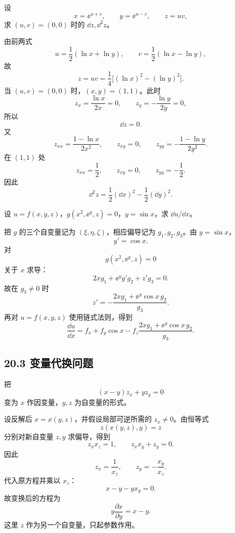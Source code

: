 \begin{xexercise}[20.2.5 练习题 7]
设
\[
  x=\ee^{u+v},\qquad y=\ee^{u-v},\qquad z=uv,
\]
求 $(u,v)=(0,0)$ 时的 $\dd z,\dd^2z$。
\end{xexercise}
\begin{xsolution}
由前两式
\[
  u=\frac12(\ln x+\ln y),
  \qquad
  v=\frac12(\ln x-\ln y),
\]
故
\[
  z=uv=\frac14\bigl[(\ln x)^2-(\ln y)^2\bigr].
\]
当 $(u,v)=(0,0)$ 时，$(x,y)=(1,1)$。此时
\[
  z_x=\frac{\ln x}{2x}=0,
  \qquad
  z_y=-\frac{\ln y}{2y}=0,
\]
所以
\[
  \boxed{\dd z=0}.
\]
又
\[
  z_{xx}=\frac{1-\ln x}{2x^2},
  \qquad z_{xy}=0,
  \qquad
  z_{yy}=-\frac{1-\ln y}{2y^2}.
\]
在 $(1,1)$ 处
\[
  z_{xx}=\frac12,
  \qquad z_{xy}=0,
  \qquad z_{yy}=-\frac12.
\]
因此
\[
  \boxed{\displaystyle
    \dd^2z=\frac12(\dd x)^2-\frac12(\dd y)^2}.
\]
\end{xsolution}

\begin{xexercise}[20.2.5 练习题 8]
设 $u=f(x,y,z)$，$g(x^2,\ee^y,z)=0$，$y=\sin x$，求 $\dd u/\dd x$。
\end{xexercise}
\begin{xsolution}
把 $g$ 的三个自变量记为 $(\xi,\eta,\zeta)$，相应偏导记为 $g_1,g_2,g_3$。由 $y=\sin x$，
\[
  y'=\cos x.
\]
对
\[
  g(x^2,\ee^y,z)=0
\]
关于 $x$ 求导：
\[
  2xg_1+\ee^y y'g_2+z'g_3=0.
\]
故在 $g_3\ne0$ 时
\[
  z'=-\frac{2xg_1+\ee^y\cos x\,g_2}{g_3}.
\]
再对 $u=f(x,y,z)$ 使用链式法则，得到
\[
  \boxed{\displaystyle
  \frac{\dd u}{\dd x}
  =f_x+f_y\cos x
   -f_z\frac{2xg_1+\ee^y\cos x\,g_2}{g_3}}.
\]
\end{xsolution}

\subsection*{20.3 变量代换问题}

\begin{xexercise}[20.3.3 练习题 1]
把
\[
  (x-y)z_x+yz_y=0
\]
变为 $x$ 作因变量，$y,z$ 为自变量的形式。
\end{xexercise}
\begin{xsolution}
设反解后 $x=x(y,z)$，并假设局部可逆所需的 $z_x\ne0$。由恒等式
\[
  z(x(y,z),y)=z
\]
分别对新自变量 $z,y$ 求偏导，得到
\[
  z_xx_z=1,
  \qquad
  z_xx_y+z_y=0.
\]
因此
\[
  z_x=\frac1{x_z},
  \qquad
  z_y=-\frac{x_y}{x_z}.
\]
代入原方程并乘以 $x_z$：
\[
  x-y-yx_y=0.
\]
故变换后的方程为
\[
  \boxed{\displaystyle y\frac{\partial x}{\partial y}=x-y}.
\]
这里 $z$ 作为另一个自变量，只起参数作用。
\end{xsolution}

